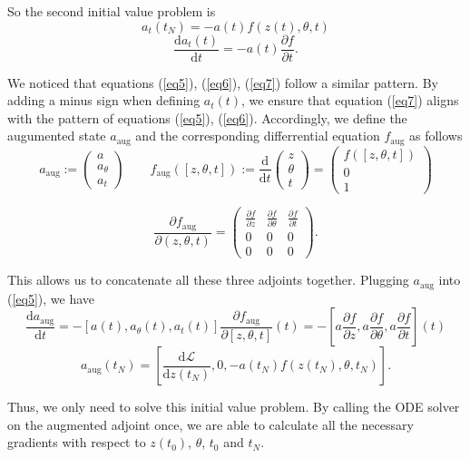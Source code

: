 \documentclass[a4paper,11pt,titlepage]{article}
\theoremstyle{definition}
\theoremstyle{plain}
\theoremstyle{remark}
\begin{document}
So the second initial value problem is 
$$a_t(t_N)=-a(t)f(z(t),\theta,t)$$
\begin{equation}\label{eq7}
    \frac{\mathrm{d}a_t(t)}{\mathrm{d}t} = -a(t)\frac{\partial f}{\partial t}. \tag{7}
\end{equation}

We noticed that equations (\ref{eq5}), (\ref{eq6}), (\ref{eq7}) follow a similar pattern. By adding a minus sign when defining $a_t(t)$, we ensure that equation (\ref{eq7}) aligns with the pattern of equations (\ref{eq5}), (\ref{eq6}). Accordingly, we define the augumented state $a_{\mathrm{aug}}$ and the corresponding differrential equation $f_{\mathrm{aug}}$ as follows
$$a_{\mathrm{aug}}:= \begin{pmatrix}a\\ a_\theta\\ a_t\end{pmatrix}\quad\quad f_{\mathrm{aug}}\left([z,\theta,t]\right):=\frac{\mathrm{d}}{\mathrm{d}t}\begin{pmatrix}z\\\theta\\ t\end{pmatrix}=\begin{pmatrix}f([z,\theta,t])\\0\\1\end{pmatrix}$$

\[
\frac{\partial f_{\mathrm{aug}}}{\partial (z, \theta, t)} = 
\begin{pmatrix}
\frac{\partial f}{\partial z} & \frac{\partial f}{\partial \theta} & \frac{\partial f}{\partial t} \\
0 & 0 & 0 \\
0 & 0 & 0 
\end{pmatrix}.
\]

This allows us to concatenate all these three adjoints together. Plugging $a_{\mathrm{aug}}$ into (\ref{eq5}), we have
$$
\frac{\mathrm{d}a_{\mathrm{aug}}}{\mathrm{d}t} = -[a(t), a_\theta(t), a_t(t)]\frac{\partial f_{\mathrm{aug}}}{\partial [z,\theta,t]}(t)=-\left[a\frac{\partial f}{\partial z},a\frac{\partial f}{\partial \theta},a\frac{\partial f}{\partial t}\right](t)
$$
$$
a_{\mathrm{aug}}(t_N)=\left[\frac{\mathrm{d}\mathcal{L}}{\mathrm{d} z(t_N)},0,-a(t_N)f(z(t_N),\theta, t_N)\right].
$$

Thus, we only need to solve this initial value problem. By calling the ODE solver on the augmented adjoint once, we are able to calculate all the necessary gradients with respect to $z(t_0)$, $\theta$, $t_0$ and $t_N$.
\end{document}
